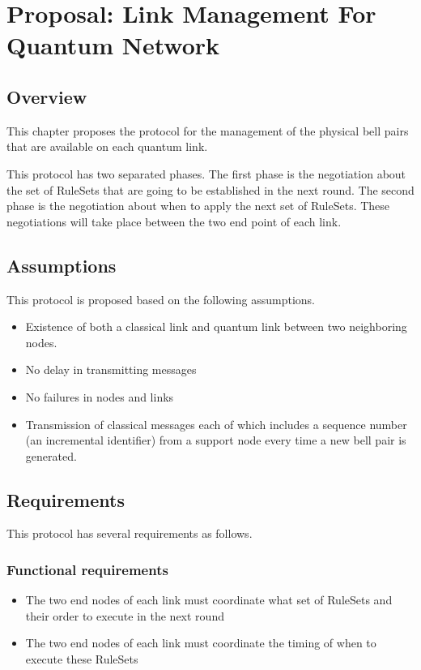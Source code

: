 \chapter{Proposal: Link Management For Quantum Network}
\label{proposal}

\section{Overview}

This chapter proposes the protocol for the management of the physical bell pairs that are available on each quantum link.

This protocol has two separated phases. The first phase is the negotiation about the set of RuleSets that are going to be established in the next round. The second phase is the negotiation about when to apply the next set of RuleSets.
These negotiations will take place between the two end point of each link.

\section{Assumptions}

This protocol is proposed based on the following assumptions.

\begin{itemize}
  \item Existence of both a classical link and quantum link between two neighboring nodes.
  \item No delay in transmitting messages 
  \item No failures in nodes and links
  \item Transmission of classical messages each of which includes a sequence number (an incremental identifier) from a support node every time a new bell pair is generated.
\end{itemize}

\section{Requirements}

This protocol has several requirements as follows.

\subsection{Functional requirements}

\begin{itemize}
  \item The two end nodes of each link must coordinate what set of RuleSets and their order to execute in the next round
  \item The two end nodes of each link must coordinate the timing of when to execute these RuleSets
\end{itemize}

